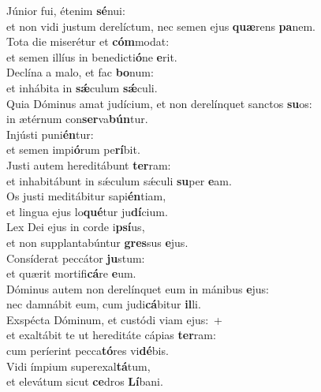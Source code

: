 \evenverse Júnior fui, étenim \textbf{sé}nui:~\*\\
\evenverse et non vidi justum derelíctum, nec semen ejus \textbf{quæ}rens \textbf{pa}nem.\\
\oddverse Tota die miserétur et \textbf{cóm}modat:~\*\\
\oddverse et semen illíus in benedicti\textbf{ó}ne \textbf{e}rit.\\
\evenverse Declína a malo, et fac \textbf{bo}num:~\*\\
\evenverse et inhábita in \textbf{sǽ}culum \textbf{sǽ}culi.\\
\oddverse Quia Dóminus amat judícium, et non derelínquet sanctos \textbf{su}os:~\*\\
\oddverse in ætérnum con\textbf{ser}va\textbf{bún}tur.\\
\evenverse Injústi puni\textbf{én}tur:~\*\\
\evenverse et semen impi\textbf{ó}rum pe\textbf{rí}bit.\\
\oddverse Justi autem hereditábunt \textbf{ter}ram:~\*\\
\oddverse et inhabitábunt in sǽculum sǽculi \textbf{su}per \textbf{e}am.\\
\evenverse Os justi meditábitur sapi\textbf{én}tiam,~\*\\
\evenverse et lingua ejus lo\textbf{qué}tur ju\textbf{dí}cium.\\
\oddverse Lex Dei ejus in corde i\textbf{psí}us,~\*\\
\oddverse et non supplantabúntur \textbf{gres}sus \textbf{e}jus.\\
\evenverse Consíderat peccátor \textbf{ju}stum:~\*\\
\evenverse et quærit mortifi\textbf{cá}re \textbf{e}um.\\
\oddverse Dóminus autem non derelínquet eum in mánibus \textbf{e}jus:~\*\\
\oddverse nec damnábit eum, cum judi\textbf{cá}bitur \textbf{il}li.\\
\evenverse Exspécta Dóminum, et custódi viam ejus:~+\\
\evenverse  et exaltábit te ut hereditáte cápias \textbf{ter}ram:~\*\\
\evenverse cum períerint pecca\textbf{tó}res vi\textbf{dé}bis.\\
\oddverse Vidi ímpium superexal\textbf{tá}tum,~\*\\
\oddverse et elevátum sicut \textbf{ce}dros \textbf{Lí}bani.\\
